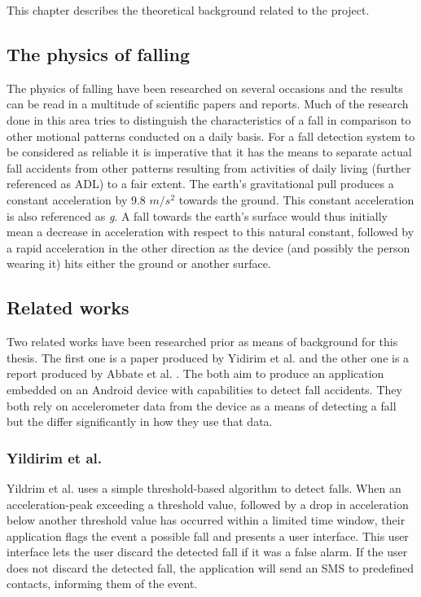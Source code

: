 \documentclass[12pt, a4paper, onecolumn]{article}
\begin{document}
	This chapter describes the theoretical background related to the project.
	
	\subsection{The physics of falling}
	The physics of falling have been researched on several occasions and the results can be read in a multitude of scientific papers and reports. Much of the research done in this area tries to distinguish the characteristics of a fall in comparison to other motional patterns conducted on a daily basis. For a fall detection system to be considered as reliable it is imperative that it has the means to separate actual fall accidents from other patterns resulting from activities of daily living (further referenced as ADL) to a fair extent. The earth's gravitational pull produces a constant acceleration by 9.8 $m/s^{2}$ towards the ground. This constant acceleration is also referenced as \textit{g}. A fall towards the earth's surface would thus initially mean a decrease in acceleration with respect to this natural constant, followed by a rapid acceleration in the other direction as the device (and possibly the person wearing it) hits either the ground or another surface.
	
	
	\subsection{Related works} Two related works have been researched prior as means of background for this thesis. The first one is a paper produced by Yidirim et al. \cite{int_journ} and the other one is a report produced by Abbate et al. \cite{piza_uni}. The both aim to produce an application embedded on an Android device with capabilities to detect fall accidents. They both rely on accelerometer data from the device as a means of detecting a fall but the differ significantly in how they use that data. 
	
	\subsubsection{Yildirim et al.}
	Yildrim et al. \cite{int_journ} uses a simple threshold-based algorithm to detect falls. When an acceleration-peak exceeding a threshold value, followed by a drop in acceleration below another threshold value has occurred within a limited time window, their application flags the event a possible fall and presents a user interface. This user interface lets the user discard the detected fall if it was a false alarm. If the user does not discard the detected fall, the application will send an SMS to predefined contacts, informing them of the event. 
	
\end{document}
